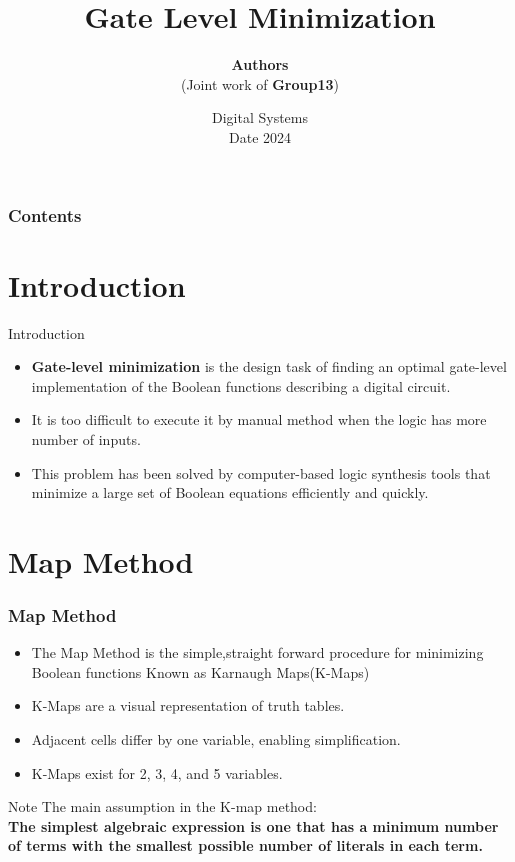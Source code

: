 \documentclass[Serif, 10pt, brown]{beamer}
\title[{Paper Short Title}]{\sc Gate Level Minimization}
\author[\ul{Authors}]{{\bf Authors}\\ \scriptsize{(Joint work of {\bf Group13})}}
\institute[UTD]{\sc\small Indian Institute Of Technology Hyderabad}%
\date[UCI]{Digital Systems \\ Date 2024}
\theoremstyle{example}
\theoremstyle{plain}
\begin{document}
\frame{\titlepage}
%
%


\begin{frame}
	\transblindsvertical
	\frametitle{Contents}
	\tableofcontents[hidesubsections]
\end{frame}


\section[Introduction]{Introduction}

\begin{frame}{Introduction}
    \begin{itemize}
\item  \textbf{Gate-level minimization} is the design task of finding an optimal gate-level implementation
of the Boolean functions describing a digital circuit.
\item It is too difficult to execute it by manual method when the logic has more number of inputs.
\item This problem has been solved by computer-based logic synthesis tools that minimize
a large set of Boolean equations efficiently and quickly.
\end{itemize}
\end{frame}



\section[Map Method]{Map Method}
\begin{frame}
	\frametitle{Map Method}
	\transfly
	\begin{itemize}
    \item The Map Method is the simple,straight forward procedure for minimizing Boolean functions Known as Karnaugh Maps(K-Maps)
        \item K-Maps are a visual representation of truth tables.
        \item Adjacent cells differ by one variable, enabling simplification.
        \item K-Maps exist for 2, 3, 4, and 5 variables.
    \end{itemize}
	\begin{exampleblock}{Note}
		The main assumption in the K-map method:\\
        \textbf{The simplest algebraic
expression is one that has a minimum number of terms with the smallest possible number
of literals in each term.}
	\end{exampleblock}

\end{frame}
\end{document}
